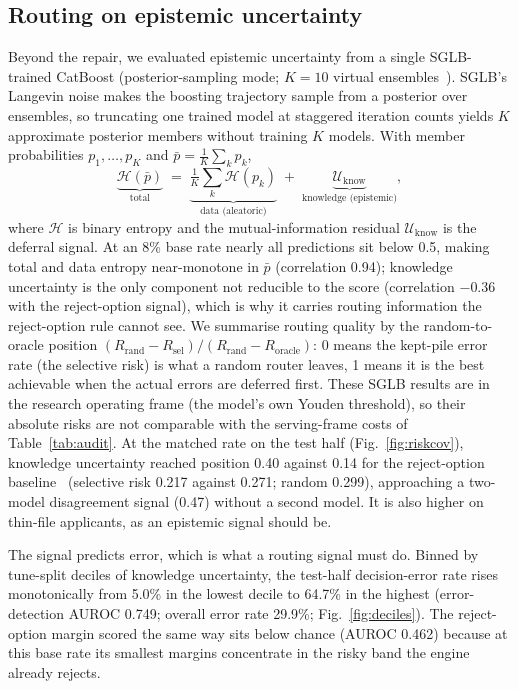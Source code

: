 \documentclass[conference]{IEEEtran}
\begin{document}
\subsection{Routing on epistemic uncertainty}
Beyond the repair, we evaluated epistemic uncertainty from a single
SGLB-trained CatBoost (posterior-sampling mode; $K{=}10$ virtual
ensembles~\cite{ustimenko2021,malinin2021}). SGLB's Langevin noise makes
the boosting trajectory sample from a posterior over ensembles, so
truncating one trained model at staggered iteration counts yields $K$
approximate posterior members without training $K$ models. With member
probabilities $p_1,\dots,p_K$ and $\bar{p} = \tfrac{1}{K}\sum_k p_k$,
\begin{equation}
\underbrace{\mathcal{H}(\bar{p})}_{\text{total}} \;=\;
\underbrace{\tfrac{1}{K}\textstyle\sum_k \mathcal{H}(p_k)}_{\text{data (aleatoric)}}
\;+\; \underbrace{\mathcal{U}_{\mathrm{know}}}_{\text{knowledge (epistemic)}} ,
\label{eq:decomp}
\end{equation}
where $\mathcal{H}$ is binary entropy and the mutual-information residual
$\mathcal{U}_{\mathrm{know}}$ is the deferral signal. At an 8\% base rate
nearly all predictions sit below 0.5, making total and data entropy
near-monotone in $\bar{p}$ (correlation 0.94); knowledge uncertainty is the
only component not reducible to the score (correlation $-0.36$ with the
reject-option signal), which is why it carries routing information the
reject-option rule cannot see. We summarise routing quality by the
random-to-oracle position
$(R_{\mathrm{rand}} - R_{\mathrm{sel}})/(R_{\mathrm{rand}} -
R_{\mathrm{oracle}})$: 0 means the kept-pile error rate (the selective
risk) is what a random router leaves, 1 means it is the best achievable
when the actual errors are deferred first. These SGLB results are in the
research operating frame (the model's own Youden threshold), so their
absolute risks are not comparable with the serving-frame costs of
Table~\ref{tab:audit}. At the matched rate on the test half
(Fig.~\ref{fig:riskcov}), knowledge uncertainty reached position 0.40
against 0.14 for the reject-option baseline~\cite{chow1970} (selective risk
0.217 against 0.271; random 0.299), approaching a two-model disagreement
signal (0.47) without a second model. It is also higher on thin-file
applicants, as an epistemic signal should be.

The signal predicts error, which is what a routing signal must do. Binned
by tune-split deciles of knowledge uncertainty, the test-half
decision-error rate rises monotonically from 5.0\% in the lowest decile to
64.7\% in the highest (error-detection AUROC 0.749; overall error rate
29.9\%; Fig.~\ref{fig:deciles}). The reject-option margin scored the same
way sits below chance (AUROC 0.462) because at this base rate its smallest
margins concentrate in the risky band the engine already rejects.
\end{document}
